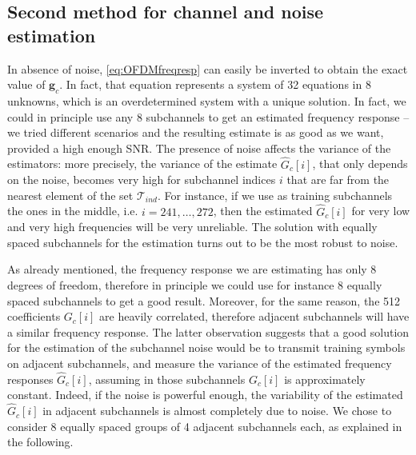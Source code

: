 \documentclass[10pt]{article}
\begin{document}
\subsection*{Second method for channel and noise estimation}

In absence of noise, \eqref{eq:OFDMfreqresp} can easily be inverted to obtain the exact value of $\mathbf{g}_c$. In fact, that equation represents a system of 32 equations in 8 unknowns, which is an overdetermined system with a unique solution. In fact, we could in principle use any 8 subchannels to get an estimated frequency response -- we tried different scenarios and the resulting estimate is as good as we want, provided a high enough SNR. The presence of noise affects the variance of the estimators: more precisely, the variance of the estimate $\hat{G}_c[i]$, that only depends on the noise, becomes very high for subchannel indices $i$ that are far from the nearest element of the set $\mathcal{T}_{ind}$. For instance, if we use as training subchannels the ones in the middle, i.e. $i = 241,\ldots,272$, then the estimated $\hat{G}_c[i]$ for very low and very high frequencies will be very unreliable. The solution with equally spaced subchannels for the estimation turns out to be the most robust to noise.

As already mentioned, the frequency response we are estimating has only 8 degrees of freedom, therefore in principle we could use for instance 8 equally spaced subchannels to get a good result. Moreover, for the same reason, the 512 coefficients $G_c[i]$ are heavily correlated, therefore adjacent subchannels will have a similar frequency response. The latter observation suggests that a good solution for the estimation of the subchannel noise would be to transmit training symbols on adjacent subchannels, and measure the variance of the estimated frequency responses $\hat{G}_c[i]$, assuming in those subchannels $G_c[i]$ is approximately constant. Indeed, if the noise is powerful enough, the variability of the estimated $\hat{G}_c[i]$ in adjacent subchannels is almost completely due to noise. We chose to consider 8 equally spaced groups of 4 adjacent subchannels each, as explained in the following.
\end{document}
